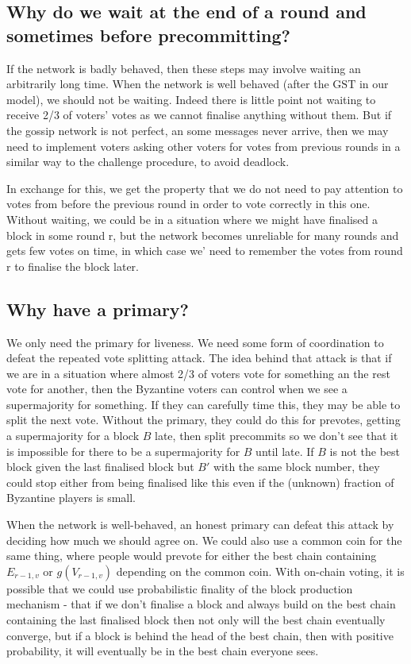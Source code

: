 \documentclass{article}
\def\GST{\mathrm{GST}}
\begin{document}
\subsection{Why do we wait at the end of a round and sometimes before precommitting?}

If the network  is badly behaved, then these steps may involve waiting an arbitrarily long time. When the network is well behaved (after the $\GST$ in our model), we should not be waiting. Indeed there is little point not waiting to receive 2/3 of voters' votes as we cannot finalise anything without them.
But if the gossip network is not perfect, an some messages never arrive, then we may need to implement voters asking other voters for votes from previous rounds in a similar way to the challenge procedure, to avoid deadlock.

In exchange for this, we get the property that we do not need to pay attention to votes from before the previous round in order to vote correctly in this one. Without waiting, we could be in a situation where we might have finalised a block in some round r, but the network becomes unreliable for many rounds and gets few votes on time, in which case we' need to remember the votes from round r to finalise the block later. 

\subsection{Why have a primary?}

We only need the primary for liveness. 
We need some form of coordination to defeat the repeated vote splitting attack. The idea behind that attack is that if we are in a situation where almost 2/3 of voters vote for something an the rest vote for another, then the Byzantine voters can control when we see a supermajority for something. If they can carefully time this, they may be able to split the next vote. 
Without the primary, they could do this for prevotes, getting a supermajority for a block $B$ late, then split precommits so we don't see that it is impossible for there to be a supermajority for $B$ until late. 
If $B$ is not the best block given the last finalised block but $B'$  with the same block number, they could stop either from being finalised like this even if the (unknown) fraction of Byzantine players is small.

When the network is well-behaved, an honest primary can defeat this attack by deciding how much we should agree on. We could also use a common coin for the same thing, where people would prevote for either the best chain containing $E_{r-1,v}$ or $g(V_{r-1,v})$ depending on the common coin.
With on-chain voting, it is possible that we could use probabilistic finality of the block production mechanism - that if we don't finalise a block and always build on the best chain containing the last finalised block then not only will the best chain eventually converge, but if a block is behind the head of the best chain, then with positive probability, it will eventually be in the best chain everyone sees.
\end{document}
